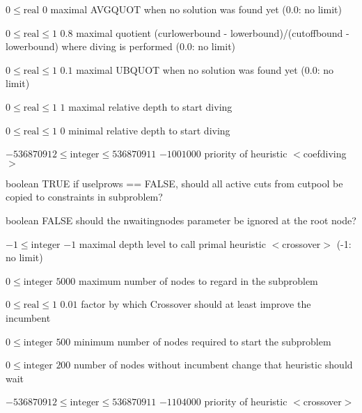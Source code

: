 %
{$0\leq\textrm{real}$}%
{$0$}%
{maximal AVGQUOT when no solution was found yet (0.0: no limit)}%
{}

%
{$0\leq\textrm{real}\leq1$}%
{$0.8$}%
{maximal quotient (curlowerbound - lowerbound)/(cutoffbound - lowerbound) where diving is performed (0.0: no limit)}%
{}

%
{$0\leq\textrm{real}\leq1$}%
{$0.1$}%
{maximal UBQUOT when no solution was found yet (0.0: no limit)}%
{}

%
{$0\leq\textrm{real}\leq1$}%
{$1$}%
{maximal relative depth to start diving}%
{}

%
{$0\leq\textrm{real}\leq1$}%
{$0$}%
{minimal relative depth to start diving}%
{}

%
{$-536870912\leq\textrm{integer}\leq536870911$}%
{$-1001000$}%
{priority of heuristic $<$coefdiving$>$}%
{}

%
{boolean}%
{TRUE}%
{if uselprows == FALSE, should all active cuts from cutpool be copied to constraints in subproblem?}%
{}

%
{boolean}%
{FALSE}%
{should the nwaitingnodes parameter be ignored at the root node?}%
{}

%
{$-1\leq\textrm{integer}$}%
{$-1$}%
{maximal depth level to call primal heuristic $<$crossover$>$ (-1: no limit)}%
{}

%
{$0\leq\textrm{integer}$}%
{$5000$}%
{maximum number of nodes to regard in the subproblem}%
{}

%
{$0\leq\textrm{real}\leq1$}%
{$0.01$}%
{factor by which Crossover should at least improve the incumbent}%
{}

%
{$0\leq\textrm{integer}$}%
{$500$}%
{minimum number of nodes required to start the subproblem}%
{}

%
{$0\leq\textrm{integer}$}%
{$200$}%
{number of nodes without incumbent change that heuristic should wait}%
{}

%
{$-536870912\leq\textrm{integer}\leq536870911$}%
{$-1104000$}%
{priority of heuristic $<$crossover$>$}%
{}


